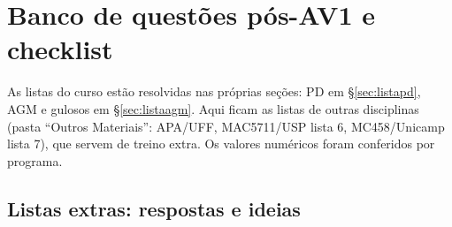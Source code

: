\section{Banco de questões pós-AV1 e checklist}\label{sec:bancoav2}
As listas do curso estão resolvidas nas próprias seções: PD em §\ref{sec:listapd}, AGM e gulosos em §\ref{sec:listaagm}. Aqui ficam as listas de outras disciplinas (pasta ``Outros Materiais'': APA/UFF, MAC5711/USP lista 6, MC458/Unicamp lista 7), que servem de treino extra. Os valores numéricos foram conferidos por programa.

\subsection{Listas extras: respostas e ideias}
